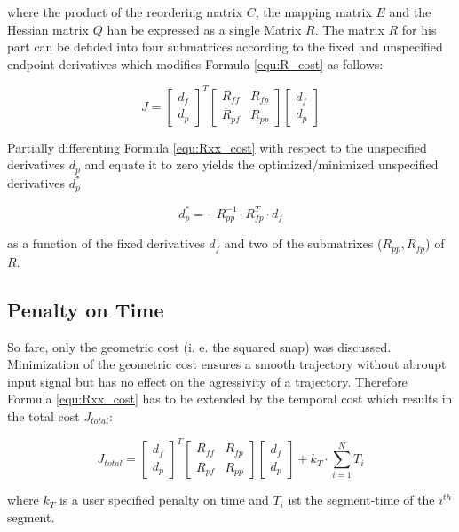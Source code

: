where the product of the reordering matrix $C$, the mapping matrix $E$ and the Hessian matrix $Q$ han be expressed as a single Matrix $R$. The matrix $R$ for his part can be defided into four submatrices according to the fixed and unspecified endpoint derivatives which modifies Formula \ref{equ:R_cost} as follows:

\begin{equation}
J =
\begin{bmatrix}
   d_f \\
  d_p
\end{bmatrix}^T
\begin{bmatrix}
   R_{ff} & R_{fp} \\
  R_{pf} & R_{pp}
\end{bmatrix}
\begin{bmatrix}
   d_f \\
  d_p
\end{bmatrix}
\label{equ:Rxx_cost}
\end{equation}

Partially differenting Formula \ref{equ:Rxx_cost} with respect to the unspecified derivatives $d_p$ and equate it to zero yields the optimized/minimized unspecified derivatives $d_p^*$ 

\begin{equation}
d_p^* = - R_{pp}^{-1} \cdot R_{fp}^T \cdot d_f
\end{equation}

as a function of the fixed derivatives $d_f$ and two of the submatrixes ($R_{pp}, R_{fp}$) of $R$.

\subsection{Penalty on Time}\label{sec:penalty}

So fare, only the geometric cost (i. e. the squared snap) was discussed. Minimization of the geometric cost ensures a smooth trajectory without abroupt input signal but has no effect on the agressivity of a trajectory. Therefore Formula \ref{equ:Rxx_cost} has to be extended by the temporal cost which results in the total cost $J_{total}$:

\begin{equation}
J_{total} =
\begin{bmatrix}
   d_f \\
  d_p
\end{bmatrix}^T
\begin{bmatrix}
   R_{ff} & R_{fp} \\
  R_{pf} & R_{pp}
\end{bmatrix}
\begin{bmatrix}
   d_f \\
  d_p
\end{bmatrix}
+ k_T \cdot \sum_{i=1}^N T_i
\label{equ:total_cost}
\end{equation}

where $k_T$ is a user specified penalty on time and $T_i$ ist the segment-time of the $i^{th}$ segment.






















